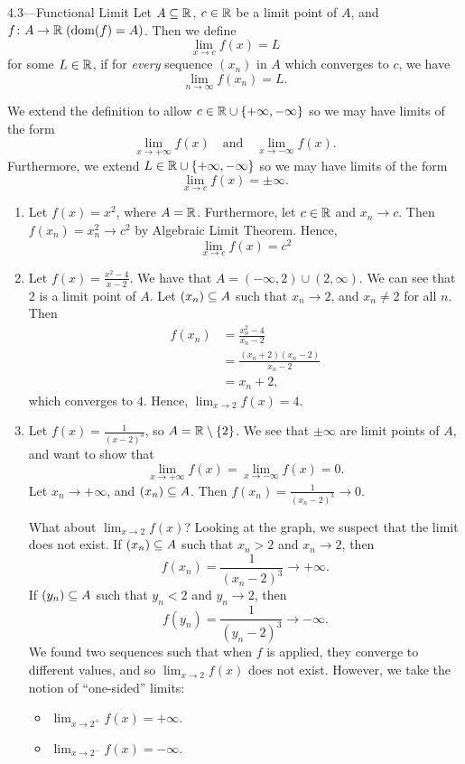 \documentclass[class=article, crop=false]{standalone}
\begin{document}
  \begin{definition}{4.3---Functional Limit}
    Let $A\subseteq\mathbb{R}$, $c\in\mathbb{R}$ be a limit point of $A$, and $f\colon A\to \mathbb{R}\; (\operatorname{dom}(f) = A)$. Then we define
    \[
      \lim_{x\to c} f(x) = L
    \]
    for some $L\in \mathbb{R}$, if for \emph{every} sequence $(x_n)$ in $A$ which converges to $c$, we have
    \[
      \lim_{n\to \infty} f(x_n) = L.
    \]
  \end{definition}
  \begin{note}{}
    We extend the definition to allow $c\in\mathbb{R}\cup \left\{+\infty, -\infty\right\}$ so we may have limits of the form
    \[
      \lim_{x\to +\infty} f(x)\quad \text{and}\quad \lim_{x\to -\infty} f(x). \tag{$L_A\sse \overline\R$}
    \]
    Furthermore, we extend $L\in\mathbb{R}\cup \left\{+\infty, -\infty\right\}$ so we may have limits of the form
    \[
      \lim_{x\to c} f(x) = \pm\infty.
    \]
  \end{note}
  \begin{example}{}
    \begin{enumerate}[label=\arabic*)]
      \item Let $f(x) = x^2$, where $A = \mathbb{R}$. Furthermore, let $c\in\mathbb{R}$ and $x_n\to c$. Then $f(x_n) = x_n^2\to c^2$ by Algebraic Limit Theorem. Hence,
      \[
        \lim_{x\to c} f(x) = c^2
      \]
      \item Let $f(x) = \frac{x^2 - 4}{x - 2}$. We have that $A = (-\infty, 2)\cup (2, \infty)$. We can see that $2$ is a limit point of $A$. Let $(x_n)\subseteq A$ such that $x_n\to 2$, and $x_n\neq 2$ for all $n$. Then
      \begin{align*}
        f(x_n) &= \frac{x_n^2 - 4}{x_n - 2} \\
               &= \frac{(x_n + 2)(x_n - 2)}{x_n - 2} \\
               &= x_n + 2,
      \end{align*}
      which converges to $4$. Hence, $\displaystyle \lim_{x\to 2} f(x) = 4$.
      \item Let $f(x) = \frac{1}{(x - 2)^3}$, so $A = \mathbb{R}\setminus \left\{2\right\}$. We see that $\pm\infty$ are limit points of $A$, and want to show that
      \[
        \lim_{x\to +\infty} f(x) = \lim_{x\to -\infty} f(x) = 0.
      \]
      Let $x_n\to+\infty$, and $(x_n)\subseteq A$. Then $f(x_n) = \frac{1}{(x_n - 2)^3}\to 0$. \par
      What about $\displaystyle \lim_{x\to 2} f(x)$? Looking at the graph, we suspect that the limit does not exist. If $(x_n)\subseteq A$ such that $x_n > 2$ and $x_n\to 2$, then
      \[
        f(x_n) = \frac{1}{(x_n - 2)^3}\to+\infty.
      \]
      If $(y_n)\subseteq A$ such that $y_n < 2$ and $y_n\to 2$, then
      \[
        f(y_n) = \frac{1}{(y_n - 2)^3}\to-\infty.
      \]
      We found two sequences such that when $f$ is applied, they converge to different values, and so $\displaystyle \lim_{x\to 2} f(x)$ does not exist. However, we take the notion of ``one-sided'' limits:
      \begin{itemize}
        \item $\displaystyle\lim_{x\to 2^+} f(x) = +\infty$.
        \item $\displaystyle\lim_{x\to 2^-} f(x) = -\infty$.
      \end{itemize}
    \end{enumerate}
  \end{example}
\end{document}
